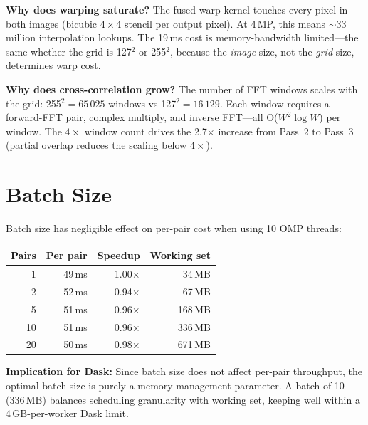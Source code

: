 \documentclass[10pt,a4paper,twocolumn]{article}
\begin{document}
\textbf{Why does warping saturate?} The fused warp kernel touches every pixel in both images (bicubic $4\times4$ stencil per output pixel). At 4\,MP, this means ${\sim}$33 million interpolation lookups. The 19\,ms cost is memory-bandwidth limited---the same whether the grid is 127$^2$ or 255$^2$, because the \emph{image} size, not the \emph{grid} size, determines warp cost.

\textbf{Why does cross-correlation grow?} The number of FFT windows scales with the grid: 255$^2 = 65\,025$ windows vs 127$^2 = 16\,129$. Each window requires a forward-FFT pair, complex multiply, and inverse FFT---all O($W^2 \log W$) per window. The $4\times$ window count drives the 2.7$\times$ increase from Pass~2 to Pass~3 (partial overlap reduces the scaling below $4\times$).

\section{Batch Size}

Batch size has negligible effect on per-pair cost when using 10 OMP threads:

\begin{center}
\small
\begin{tabular}{@{}rrrr@{}}
\toprule
\textbf{Pairs} & \textbf{Per pair} & \textbf{Speedup} & \textbf{Working set} \\
\midrule
1  & 49\,ms & 1.00$\times$ & 34\,MB \\
2  & 52\,ms & 0.94$\times$ & 67\,MB \\
5  & 51\,ms & 0.96$\times$ & 168\,MB \\
10 & 51\,ms & 0.96$\times$ & 336\,MB \\
20 & 50\,ms & 0.98$\times$ & 671\,MB \\
\bottomrule
\end{tabular}
\end{center}

\textbf{Implication for Dask:} Since batch size does not affect per-pair throughput, the optimal batch size is purely a memory management parameter. A batch of 10 (336\,MB) balances scheduling granularity with working set, keeping well within a 4\,GB-per-worker Dask limit.
\end{document}
